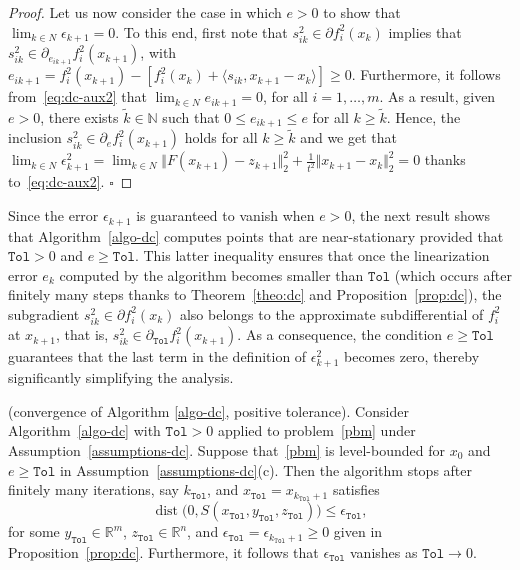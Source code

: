 \documentclass[smallextended,envcountsect]{svjour3}
\newcommand{\norm}[1]{\textstyle{\Vert} #1 \textstyle{\Vert}_2}
\newcommand{\tol}{\texttt{Tol}}
\newcommand{\inner}[2]{\langle#1,#2\rangle}
\renewcommand{\Re}{\mathbb{R}}
\newcommand{\mybox}{{\hfill $\square$}}
\newcommand{\nats}{\mathbb{N}}
\DeclareMathOperator{\dist}{dist}
\begin{document}
\begin{proof}
Let us now consider the case in which $e>0$ to show that $\lim_{k \in N} \epsilon_{k+1} =0$.
To this end,  first note that $s^2_{ik} \in \partial f_i^2(x_k)$ implies that $s^2_{ik} \in \partial_{e_{ik+1}} f_i^2(x_{k+1})$, with  $e_{ik+1}=f_i^2(x_{k+1}) - [f_i^2(x_k)+\inner{s_{ik}}{x_{k+1}-x_k}]\geq 0$. Furthermore, it follows from~\eqref{eq:dc-aux2} that $\lim_{k \in N} e_{ik+1} =0$, for all $i=1,\ldots,m$. As a result, given $e>0$, there exists $\tilde k\in \nats$  such that $0\leq e_{ik+1} \leq e$ for all $k\geq \tilde k$. Hence, the inclusion $s^2_{ik} \in \partial_{e} f_i^2(x_{k+1})$ holds for all $k \geq \tilde k$ and we get  that 
$\lim_{k \in N} \epsilon^2_{k+1} =\lim_{k \in N} \norm{F(x_{k+1})-z_{k+1}}^2+\frac{1}{t^2}\norm{x_{k+1}-x_k}^2=0$ thanks to~\eqref{eq:dc-aux2}.
\mybox
\end{proof}
% 
Since the error $\epsilon_{k+1}$ is guaranteed to vanish when $e > 0$, the next result shows that Algorithm~\ref{algo-dc} computes points that are near-stationary provided that $\tol > 0$ and $e \ge \tol$. This latter inequality ensures that once the linearization error $e_k$ computed by the algorithm becomes smaller than $\tol$ (which occurs after finitely many steps thanks to Theorem~\ref{theo:dc} and Proposition~\ref{prop:dc}), the subgradient $s^2_{ik} \in \partial f_i^2(x_k)$ also belongs to the approximate subdifferential of $f_i^2$ at $x_{k+1}$, that is,
$
s^2_{ik} \in \partial_\tol f_i^2(x_{k+1}).
$
As a consequence, the condition $e \ge \tol$ guarantees that the last term in the definition of $\epsilon_{k+1}^2$ becomes zero, thereby significantly simplifying the analysis.
%
 \begin{theorem}\label{theo:dc-epsilon}{\rm (convergence of Algorithm \ref{algo-dc}, positive tolerance).}
Consider Algorithm~\ref{algo-dc} with $\tol>0$ applied to problem~\eqref{pbm} under Assumption~\ref{assumptions-dc}.
 Suppose that~\eqref{pbm} is level-bounded for $x_0$ and $e\geq \tol$ in Assumption~\ref{assumptions-dc}(c).
 Then the algorithm stops after finitely many iterations, say $k_\tol$, and $ x_\tol=x_{k_\tol+1}$ satisfies
\[
\dist\big(0, S(x_{\tol},y_{\tol} ,z_{\tol})\big) \leq \epsilon_\tol,
\]
for some $y_\tol \in \Re^m$, $z_\tol \in \Re^n$, and $\epsilon_\tol=\epsilon_{k_\tol+1}\geq 0$ given in Proposition~\ref{prop:dc}. Furthermore, it follows that $\epsilon_\tol$ vanishes as $\tol \to 0$.
\end{theorem}
\end{document}
